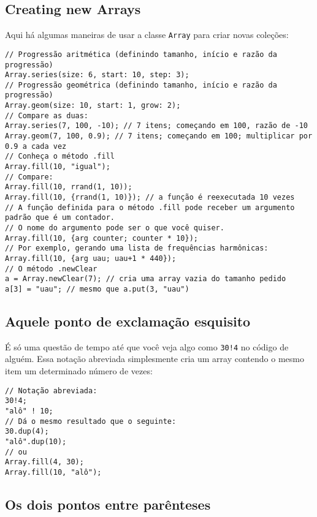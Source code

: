 \subsection{Creating new Arrays}

Aqui há algumas maneiras de usar a classe \texttt{Array} para criar novas coleções:

\begin{lstlisting}[style=SuperCollider-IDE, basicstyle=\scttfamily\footnotesize]
// Progressão aritmética (definindo tamanho, início e razão da progressão)
Array.series(size: 6, start: 10, step: 3);
// Progressão geométrica (definindo tamanho, início e razão da progressão)
Array.geom(size: 10, start: 1, grow: 2);
// Compare as duas:
Array.series(7, 100, -10); // 7 itens; começando em 100, razão de -10
Array.geom(7, 100, 0.9); // 7 itens; começando em 100; multiplicar por 0.9 a cada vez
// Conheça o método .fill
Array.fill(10, "igual");
// Compare:
Array.fill(10, rrand(1, 10)); 
Array.fill(10, {rrand(1, 10)}); // a função é reexecutada 10 vezes
// A função definida para o método .fill pode receber um argumento padrão que é um contador.
// O nome do argumento pode ser o que você quiser.
Array.fill(10, {arg counter; counter * 10});
// Por exemplo, gerando uma lista de frequências harmônicas:
Array.fill(10, {arg uau; uau+1 * 440}); 
// O método .newClear
a = Array.newClear(7); // cria uma array vazia do tamanho pedido
a[3] = "uau"; // mesmo que a.put(3, "uau")
\end{lstlisting}


\subsection{Aquele ponto de exclamação esquisito}

É só uma questão de tempo até que você veja algo como \texttt{30!4} no código de alguém. Essa notação abreviada simplesmente cria um array contendo o mesmo item um determinado número de vezes:

 
\begin{lstlisting}[style=SuperCollider-IDE, basicstyle=\scttfamily\footnotesize]
// Notação abreviada:
30!4;
"alô" ! 10;
// Dá o mesmo resultado que o seguinte:
30.dup(4);
"alô".dup(10);
// ou
Array.fill(4, 30);
Array.fill(10, "alô");
\end{lstlisting}
 

\subsection{Os dois pontos entre parênteses}

